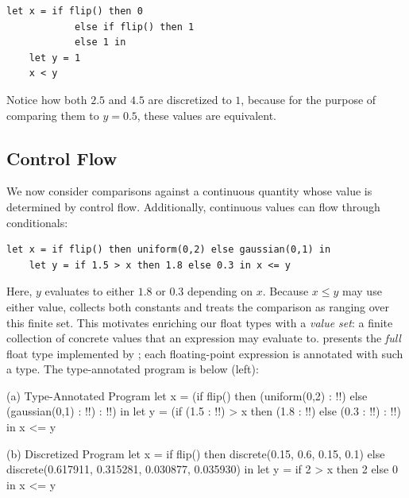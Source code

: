 \begin{lstlisting}[aboveskip=1em,belowskip=1em,gobble=4]
    let x = if flip() then 0
            else if flip() then 1
            else 1 in
    let y = 1
    x < y
\end{lstlisting}

Notice how both $2.5$ and $4.5$ are discretized to $1$, because for the purpose of comparing them to $y = 0.5$, these values are equivalent.

\fi
\subsection{Control Flow}\label{sec:examples:4}

We now consider comparisons against a continuous quantity whose value is determined by control flow. Additionally, continuous values can flow through conditionals:

\begin{lstlisting}[aboveskip=1em,belowskip=1em,escapechar=!,gobble=4]
    let x = if flip() then uniform(0,2) else gaussian(0,1) in
    let y = if 1.5 > x then 1.8 else 0.3 in x <= y
\end{lstlisting}

\noindent Here, $y$ evaluates to either $1.8$ or $0.3$ depending on $x$. Because $x \leq y$ may use either value, \Slice{} collects both constants and treats the comparison as ranging over this finite set. This motivates enriching our float types with a \emph{value set}: a finite collection of concrete values that an expression may evaluate to.  presents the \emph{full} float type implemented by \Slice{}; each floating-point expression is annotated with such a type. The type-annotated program is below (left):

\begin{tcbraster}[
    raster columns=5,
    raster equal height=rows,
    raster before skip=1.5em,
    raster after skip=1.5em,
    raster column skip=0.8em]
    \begin{programpanel}[raster multicolumn=3]{(a) Type-Annotated Program}
let x =
 (if flip() then
   (uniform(0,2) : !{}!)
 else
   (gaussian(0,1) : !{}!)
 : !{}!) in
let y =
 (if (1.5 : !{}!) > x
   then
     (1.8 : !{}!)
   else
     (0.3 : !{}!)
 : !{}!) in
x <= y
    \end{programpanel}
    \begin{programpanel}[raster multicolumn=2]{(b) Discretized Program}
let x =
 if flip() then
   discrete(0.15, 0.6, 0.15, 0.1)
 else
   discrete(0.617911, 0.315281,
            0.030877, 0.035930)
in
let y =
 if 2 > x then 2 else 0
in
x <= y
    \end{programpanel}
\end{tcbraster}
\label{fig:examples:4}

